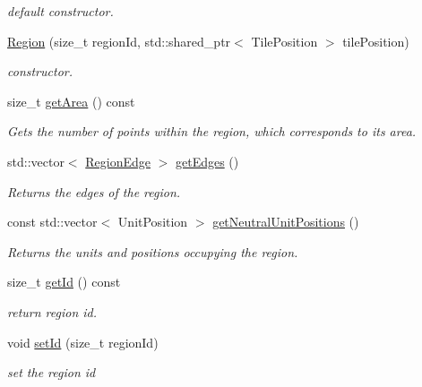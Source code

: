 \begin{DoxyCompactItemize}
\begin{DoxyCompactList}\small\item\em default constructor. \end{DoxyCompactList}\item 
\hyperlink{classOverseer_1_1Region_a8de3309b915589c86745a73c157d4a9f}{Region} (size\+\_\+t region\+Id, std\+::shared\+\_\+ptr$<$ Tile\+Position $>$ tile\+Position)
\begin{DoxyCompactList}\small\item\em constructor. \end{DoxyCompactList}\item 
size\+\_\+t \hyperlink{classOverseer_1_1Region_af4f0876669c6698a728bb84a0d13ff8d}{get\+Area} () const 
\begin{DoxyCompactList}\small\item\em Gets the number of points within the region, which corresponds to it\textquotesingle{}s area. \end{DoxyCompactList}\item 
std\+::vector$<$ \hyperlink{classOverseer_1_1RegionEdge}{Region\+Edge} $>$ \hyperlink{classOverseer_1_1Region_a5564e0d776a0b131476467d08d5b6ec3}{get\+Edges} ()
\begin{DoxyCompactList}\small\item\em Returns the edges of the region. \end{DoxyCompactList}\item 
const std\+::vector$<$ Unit\+Position $>$ \hyperlink{classOverseer_1_1Region_ad3e982a374102f10d1e109231f945d18}{get\+Neutral\+Unit\+Positions} ()
\begin{DoxyCompactList}\small\item\em Returns the units and positions occupying the region. \end{DoxyCompactList}\item 
size\+\_\+t \hyperlink{classOverseer_1_1Region_a57d131cc0afadfb9a1292471cb9477a5}{get\+Id} () const 
\begin{DoxyCompactList}\small\item\em return region id. \end{DoxyCompactList}\item 
void \hyperlink{classOverseer_1_1Region_a52fa1e6684d036d9f2761ec4cf85cd62}{set\+Id} (size\+\_\+t region\+Id)
\begin{DoxyCompactList}\small\item\em set the region id \end{DoxyCompactList}\item 

\end{DoxyCompactItemize}
